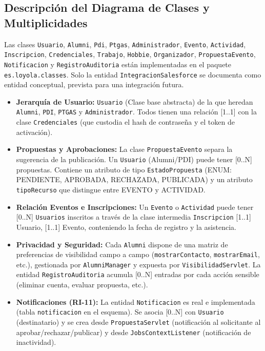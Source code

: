 \documentclass{report}
\begin{document}
\subsection{Descripción del Diagrama de Clases y Multiplicidades}
Las clases \texttt{Usuario}, \texttt{Alumni}, \texttt{Pdi}, \texttt{Ptgas}, \texttt{Administrador}, \texttt{Evento}, \texttt{Actividad}, \texttt{Inscripcion}, \texttt{Credenciales}, \texttt{Trabajo}, \texttt{Hobbie}, \texttt{Organizador}, \texttt{PropuestaEvento}, \texttt{Notificacion} y \texttt{RegistroAuditoria} están implementadas en el paquete \texttt{es.loyola.classes}. Solo la entidad \texttt{IntegracionSalesforce} se documenta como entidad conceptual, prevista para una integración futura.
\begin{itemize}
    \item \textbf{Jerarquía de Usuario:} \texttt{Usuario} (Clase base abstracta) de la que heredan \texttt{Alumni}, \texttt{PDI}, \texttt{PTGAS} y \texttt{Administrador}. Todos tienen una relación [1..1] con la clase \texttt{Credenciales} (que custodia el hash de contraseña y el token de activación).
    \item \textbf{Propuestas y Aprobaciones:} La clase \texttt{PropuestaEvento} separa la sugerencia de la publicación. Un \texttt{Usuario} (Alumni/PDI) puede tener [0..N] propuestas. Contiene un atributo de tipo \texttt{EstadoPropuesta} (ENUM: PENDIENTE, APROBADA, RECHAZADA, PUBLICADA) y un atributo \texttt{tipoRecurso} que distingue entre EVENTO y ACTIVIDAD.
    \item \textbf{Relación Eventos e Inscripciones:} Un \texttt{Evento} o \texttt{Actividad} puede tener [0..N] \texttt{Usuarios} inscritos a través de la clase intermedia \texttt{Inscripcion} [1..1] Usuario, [1..1] Evento, conteniendo la fecha de registro y la asistencia.
    \item \textbf{Privacidad y Seguridad:} Cada \texttt{Alumni} dispone de una matriz de preferencias de visibilidad campo a campo (\texttt{mostrarContacto}, \texttt{mostrarEmail}, etc.), gestionada por \texttt{AlumniManager} y expuesta por \texttt{VisibilidadServlet}. La entidad \texttt{RegistroAuditoria} acumula [0..N] entradas por cada acción sensible (eliminar cuenta, evaluar propuesta, etc.).
    \item \textbf{Notificaciones (RI-11):} La entidad \texttt{Notificacion} es real e implementada (tabla \texttt{notificacion} en el esquema). Se asocia [0..N] con \texttt{Usuario} (destinatario) y se crea desde \texttt{PropuestaServlet} (notificación al solicitante al aprobar/rechazar/publicar) y desde \texttt{JobsContextListener} (notificación de inactividad).

\end{itemize}
\end{document}
